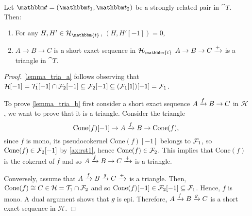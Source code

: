 \begin{lemma}\label{lemma_tria}
  Let $\t=(\t_1,\t_2)$ be a strongly related pair in $\cat{T}$. Then:
  \begin{enumerate}
    \item\label{lemma_tria_a} For any $H,H'\in\clH_\mathbbm{t}$, $(H,H'[-1])=0$,
    \item\label{lemma_tria_b} $A\to B\to C$ is a short exact sequence in $\mathcal{H}_\mathbbm{t}$ \iff $A\to B\to C\xrightarrow{+}$ is
      a triangle in $\cat{T}$.
  \end{enumerate}
\end{lemma}

\begin{proof}
  \ref{lemma_tria_a} follows observing that
  $\mathcal{H}[-1]=\mathcal{T}_1[-1]\cap\mathcal{F}_2[-1]\subseteq \mathcal{F}_2[-1]\subseteq(\mathcal{F}_1[1])[-1]=\mathcal{F}_1$.

  To prove \ref{lemma_tria_b} first consider a short exact sequence $A\xrightarrow{f} B\to C$ in $\mathcal{H}$, we want to
  prove that it is a triangle. Consider the triangle
  \begin{equation*}
    \mathrm{Cone}(f)[-1]\to A\xrightarrow{f} B \to \mathrm{Cone}(f),
  \end{equation*}
  since $f$ is mono, its pseudocokernel $\mathrm{Cone}(f)[-1]$ belongs to $\mathcal{F}_1$, so
  $\mathrm{Cone}(f)\in\mathcal{F}_2[-1]$ by \ref{ax:rst1}, hence $\mathrm{Cone}(f)\in\mathcal{F}_2$.
  This implies that $\mathrm{Cone}(f)$ is the cokernel of $f$ and so $A\xrightarrow{f} B\to C\xrightarrow{+}$ is a triangle.

  Conversely, assume that $A\xrightarrow{f} B\xrightarrow{g} C\xrightarrow{+}$ is a triangle. Then, $\mathrm{Cone}(f)\cong C\in\mathcal{H}=\mathcal{T}_1\cap\mathcal{F}_2$ and
  so $\mathrm{Cone}(f)[-1]\in\mathcal{F}_2[-1]\subseteq \mathcal{F}_1$. Hence, $f$ is mono. A dual argument
  shows that $g$ is epi. Therefore, $A\xrightarrow{f} B\xrightarrow{g} C$ is a short exact sequence in $\mathcal{H}$.
\end{proof}

